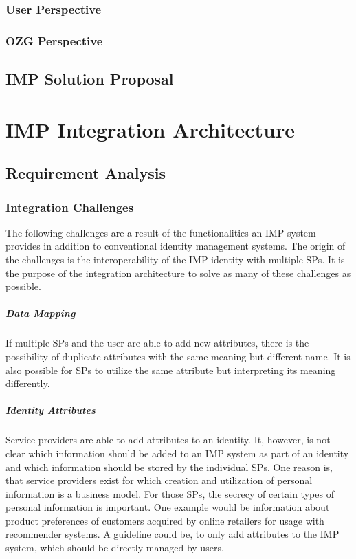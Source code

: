 \documentclass[
     12pt,         %
     a4paper,      %
     BCOR=10mm,version=first,     %
     DIV=14,version=first,        %
     ]{scrreprt}
\begin{document}
\subsection{User Perspective}

\subsection{OZG Perspective}

\section{IMP Solution Proposal}

\chapter{IMP Integration Architecture}

\section{Requirement Analysis}

\subsection{Integration Challenges}

The following challenges are a result of the functionalities an IMP system provides in addition to conventional identity management systems. The origin of the challenges is the interoperability of the IMP identity with multiple SPs. It is the purpose of the integration architecture to solve as many of these challenges as possible.

\paragraph{Data Mapping}
If multiple SPs and the user are able to add new attributes, there is the possibility of duplicate attributes with the same meaning but different name. It is also possible for SPs to utilize the same attribute but interpreting its meaning differently.

\paragraph{Identity Attributes}
Service providers are able to add attributes to an identity. It, however, is not clear which information should be added to an IMP system as part of an identity and which information should be stored by the individual SPs. One reason is, that service providers exist for which creation and utilization of personal information is a business model. For those SPs, the secrecy of certain types of personal information is important. One example would be information about product preferences of customers acquired by online retailers for usage with recommender systems.
A guideline could be, to only add attributes to the IMP system, which should be directly managed by users.
\end{document}
